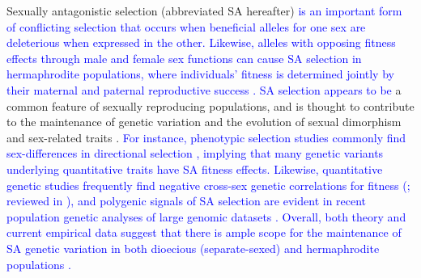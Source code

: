 \documentclass[11pt]{article}
\begin{document}
Sexually antagonistic selection (abbreviated SA hereafter) \textcolor{blue}{is an important form of conflicting selection that occurs when beneficial alleles for one sex are deleterious when expressed in the other. Likewise, alleles with opposing fitness effects through male and female sex functions can cause SA selection in hermaphrodite populations, where individuals' fitness is determined jointly by their maternal and paternal reproductive success \citep{LloydWebb1986, WebbLloyd1986, Abbott2011, JordanConnallon2014}. SA selection appears to be} a common feature of sexually reproducing populations, and is thought to contribute to the maintenance of genetic variation and the evolution of sexual dimorphism and sex-related traits \citep{Kidwell1977, Lande1980, Rice1992, Charlesworth1999, RiceChippindale2001, ConnallonClark2012, BondurianskyChenoweth2009, Olito2019}. \textcolor{blue}{For instance, phenotypic selection studies commonly find sex-differences in directional selection \citep[e.g.,][]{DeLisle-etal-2018,Lewis-etal-2011,CoxCalsbeek2009,SinghPunzalan2018}, implying that many genetic variants underlying quantitative traits have SA fitness effects. Likewise, quantitative genetic studies frequently find negative cross-sex genetic correlations for fitness (\citealt{Chippendale-etal-2001,Delph-etal-2011}; reviewed in \citealt{ConnallonMatthews2019}), and polygenic signals of SA selection are evident in recent population genetic analyses of large genomic datasets \citep{RuzickaESEB2020, RuzickaConnallon2022}. Overall, both theory and current empirical data suggest that there is ample scope for the maintenance of SA \textcolor{blue}{genetic variation} in both dioecious \textcolor{blue}{(separate-sexed)} and hermaphrodite populations \citep{BondurianskyChenoweth2009, Abbott2011, RuzickaESEB2020}.}

\end{document}
